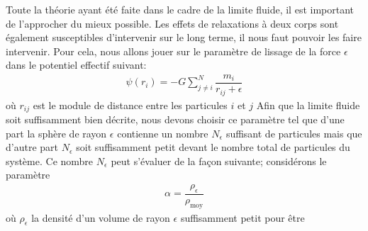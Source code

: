 			Toute la théorie ayant été faite dans le cadre de la limite fluide, %
			il est important de l'approcher du mieux possible. %
			Les effets de relaxations à deux corps sont également susceptibles d'intervenir sur le long
			terme, il nous faut pouvoir les faire intervenir. %
			Pour cela, nous allons jouer sur
			le paramètre de lissage de la force $\epsilon$ dans le potentiel
			effectif suivant:
			\begin{align}
				\psi(r_{i}) = - G \sum_{j \neq i}^{N}\dfrac{m_i}{r_{ij} + \epsilon}
			\end{align}
			où $r_{ij}$ est le module de distance entre les particules $i$ et $j$
			Afin que la limite fluide soit suffisamment bien décrite, nous devons choisir ce
			paramètre tel que d'une part la sphère de rayon $\epsilon$ contienne un nombre $N_\epsilon$ suffisant de particules
			mais que d'autre part $N_\epsilon$ soit suffisamment petit devant le nombre total de particules du système.
			Ce nombre $N_\epsilon$ peut s'évaluer de la façon suivante; considérons le paramètre
			\begin{align*}
				\alpha = \dfrac{\rho_\epsilon}{\rho_\mathrm{moy}}
			\end{align*}
			où $\rho_\epsilon$ la densité d'un volume de rayon $\epsilon$ suffisamment petit pour être
